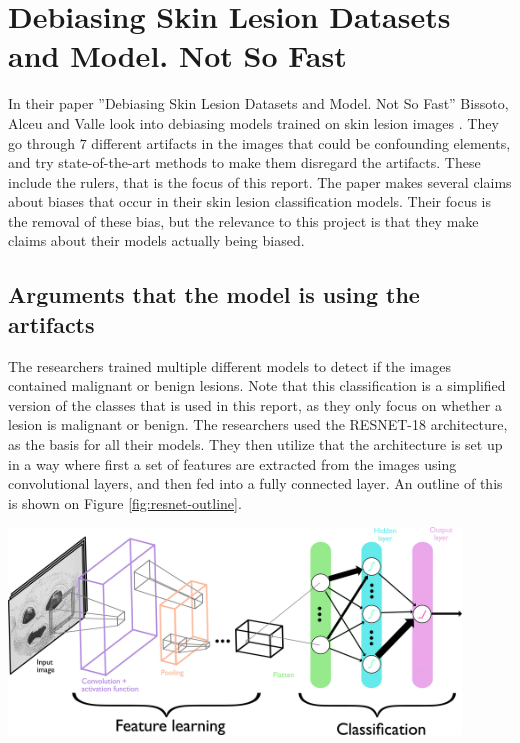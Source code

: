 \section{Debiasing Skin Lesion Datasets and Model. Not So Fast}\label{sec:debias-not-so-fast}
In their paper
''Debiasing Skin Lesion Datasets and Model. Not So Fast''
Bissoto, Alceu and Valle look into debiasing models trained on
skin lesion images \cite{debias-not-so-fast}.
They go through $7$ different artifacts in the images that could
be confounding elements, and try state-of-the-art methods to
make them disregard the artifacts.
These include the rulers, that is the focus of this report.
The paper makes several claims about biases that occur in
their skin lesion classification models.
Their focus is the removal of these bias, but the relevance to this project is that they
make claims about their models actually being biased.

\subsection{Arguments that the model is using the artifacts}
The researchers trained multiple different models to detect if the
images contained malignant or benign lesions.
Note that this classification is a simplified version of the classes
that is used in this report, as they only focus on whether a lesion is malignant or benign.
The researchers used the RESNET-18 architecture, as the basis for all their models.
They then utilize that the architecture is set up in a way where first a set of features
are extracted from the images using convolutional layers, and then fed into a fully connected layer. 
An outline of this is shown on Figure \ref{fig:resnet-outline}.

\begin{center}
    \includegraphics[width=0.9\textwidth]{images/ConvNet_V2.png}
    \label{fig:resnet-outline}
\end{center}

